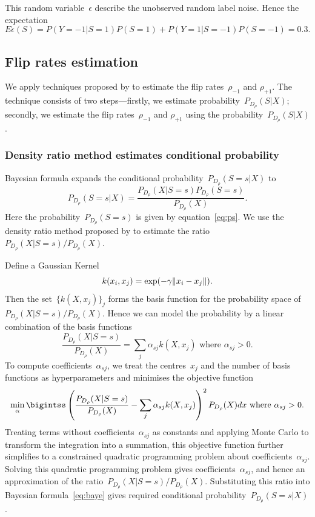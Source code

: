 \documentclass[12pt]{article} %
\DeclarePairedDelimiter{\norm}{\lVert}{\rVert}
\newcommand{\rhoo}{\rho_{+1}}
\newcommand{\rhoz}{\rho_{-1}}
\begin{document}
This random variable~$\epsilon$ describe the unobserved random label noise. Hence the expectation
\begin{equation}
    E\epsilon(S)=P(Y=-1|S=1)P(S=1)+P(Y=1|S=-1)P(S=-1)
    =0.3.\label{eq:exp}
\end{equation}

\subsection{Flip rates estimation}\label{method2}
We apply techniques proposed by \citet{liu2016classification} to estimate the flip rates~$\rhoz$ and $\rhoo$. The technique consists of two steps---firstly, we estimate probability~$P_{D_\rho}(S|X)$; secondly, we estimate the flip rates~$\rhoz$ and $\rhoo$ using the probability~$P_{D_\rho}(S|X)$.



\subsubsection{Density ratio method estimates conditional probability}\label{method22}
Bayesian formula expands the conditional probability~$P_{D_\rho}(S=s|X)$ to
\begin{equation}
   P_{D_\rho}(S=s|X)=\frac{P_{D_\rho}(X|S=s)P_{D_\rho}(S=s)}{P_{D_\rho}(X)}.\label{eq:baye}
\end{equation}
Here the probability~$P_{D_\rho}(S=s)$ is given by equation~\eqref{eq:ps}. We use the density ratio method proposed by \citet{DBLP:journals/jmlr/KanamoriHS09} to estimate the ratio~${P_{D_\rho}(X|S=s)}/{P_{D_\rho}(X)}$.

Define a Gaussian Kernel
\begin{equation}\label{eq:gauss}
k(x_i,x_j)=\exp(-\gamma\norm{x_i-x_j}).
\end{equation}
Then the set~$\{k(X,x_j) \}_j$ forms the basis function for the probability space of ${P_{D_\rho}(X|S=s)}/{P_{D_\rho}(X)}$. Hence we can model the probability by a linear combination of the basis functions
\begin{equation*}
   \frac{P_{D_\rho}(X|S=s)}{P_{D_\rho}(X)}=\sum_j \alpha_{sj} k(X,x_j) \text{ where }\alpha_{sj}>0.%
\end{equation*}
To compute coefficients~$\alpha_{sj}$, we treat the centres~$x_j$ and the number of basis functions as hyperparameters and minimises the objective function
\begin{equation*}
  \min_\alpha \bigintss \left(\frac{P_{D_\rho}(X|S=s)}{P_{D_\rho}(X)}-\sum_j \alpha_{sj} k(X,x_j)\right)^2P_{D_\rho}(X)dx \text{ where }\alpha_{sj}>0.
\end{equation*}
Treating terms without coefficients~$\alpha_{sj}$ as constants and applying Monte Carlo to transform the integration into a summation, this objective function further simplifies to a constrained quadratic programming problem about coefficients~$\alpha_{sj}$. Solving this quadratic programming problem gives coefficients~$\alpha_{sj}$, and hence an approximation of the ratio~${P_{D_\rho}(X|S=s)}/{P_{D_\rho}(X)}$. Substituting this ratio into Bayesian formula~\eqref{eq:baye} gives required conditional probability~$P_{D_\rho}(S=s|X)$.
\end{document}
